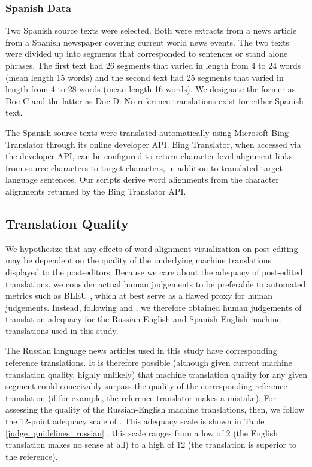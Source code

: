\subsubsection{Spanish Data}

Two Spanish source texts were selected. Both were extracts from a news article from a Spanish newspaper covering current world news events. 
%
The two texts were divided up into segments that corresponded to sentences or stand alone phrases. 
%
The first text had 26 segments that varied in length from 4 to 24 words (mean length 15 words) and the second text had 25 segments that varied in length from 4 to 28 words (mean length 16 words).
%
We designate the former as Doc C and the latter as Doc D.
%
No reference translations exist for either Spanish text.

The Spanish source texts were translated automatically using Microsoft Bing Translator through its online developer API.
%
Bing Translator, when accessed via the developer API, can be configured to return character-level alignment links from source characters to target characters, in addition to  translated target language sentences.
%
Our scripts derive word alignments from the character alignments returned by the Bing Translator API.



\subsection{Translation Quality}
\label{sec:translation_quality}

We hypothesize that any effects of word alignment visualization on post-editing may be dependent on the quality of the underlying machine translations displayed to the post-editors.
%
Because we care about the adequacy of post-edited translations, we consider actual human judgements to be preferable to automated metrics such as BLEU \citep{2002_ACL_Papineni_etal}, which at best serve as a flawed proxy for human judgements.
%
Instead, following \citet{2009_EACL_Albrecht_etal} and \citet{2014_WMT_Schwartz_etal}, we therefore obtained human judgements of translation adequacy for the Russian-English and Spanish-English machine translations used in this study.

The Russian language news articles used in this study have corresponding reference translations.
%
It is therefore possible (although given current machine translation quality, highly unlikely) that machine translation quality for any given segment could conceivably surpass the quality of the corresponding reference translation (if for example, the reference translator makes a mistake).
%
For assessing the quality of the Russian-English machine translations, then, we follow the 12-point adequacy scale of \citet{2014_WMT_Schwartz_etal}.
%
This adequacy scale is shown in Table \ref{judge_guidelines_russian} ;
%
this scale ranges from a low of 2 (the English translation makes no sense at all) to a high of 12 (the translation is superior to the reference).

